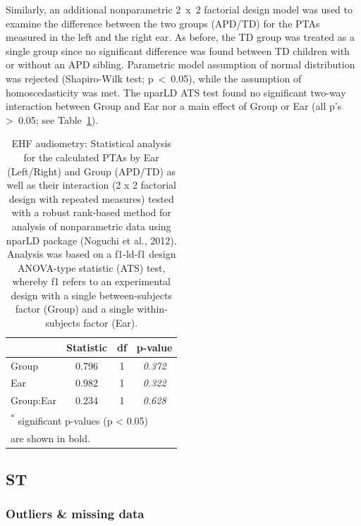\documentclass[a4paper, twoside]{templates/ociamthesis}
\begin{document}
Similarly, an additional nonparametric 2~x~2 factorial design model was used to examine the difference between the two groups (APD/TD) for the PTAs measured in the left and the right ear. As before, the TD group was treated as a single group since no significant difference was found between TD children with or without an APD sibling. Parametric model assumption of normal distribution was rejected (Shapiro-Wilk test; p~\textless~0.05), while the assumption of homoscedasticity was met. The nparLD ATS test found no significant two-way interaction between Group and Ear nor a main effect of Group or Ear (all p's \textgreater~0.05; see Table~\ref{tab:EHF-PTATabnparLD}).\\

\begin{table}

\caption{\label{tab:EHF-PTATabnparLD}EHF audiometry: Statistical analysis for the calculated PTAs by Ear (Left/Right) and Group (APD/TD) as well as their interaction (2 x 2 factorial design with repeated measures) tested with a robust rank-based method for analysis of nonparametric data using nparLD package (Noguchi et al., 2012). Analysis was based on a f1-ld-f1 design ANOVA-type statistic (ATS) test, whereby f1 refers to an experimental design with a single between-subjects factor (Group) and a single within-subjects factor (Ear).}
\centering
\begin{tabular}[t]{lcc>{}c}
\toprule
  & Statistic & df & p-value\\
\midrule
Group & 0.796 & 1 & \em{0.372}\\
Ear & 0.982 & 1 & \em{0.322}\\
Group:Ear & 0.234 & 1 & \em{0.628}\\
\bottomrule
\multicolumn{4}{l}{\textsuperscript{*} significant p-values (p < 0.05)}\\
\multicolumn{4}{l}{are shown in bold.}\\
\end{tabular}
\end{table}

\hypertarget{st}{%
\subsection{ST}\label{st}}

\hypertarget{outliers-missing-data}{%
\subsubsection*{Outliers \& missing data}\label{outliers-missing-data}}
\end{document}
